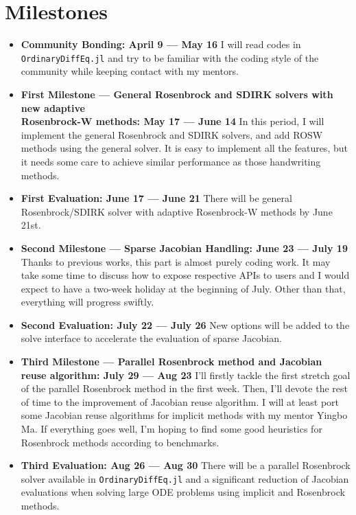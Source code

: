 \documentclass[a4paper]{article}
\begin{document}
\section{Milestones}
\label{sec:org8fb4a86}
\begin{itemize}
\item \textbf{Community Bonding: April 9 --- May 16}
I will read codes in \texttt{OrdinaryDiffEq.jl} and try to be familiar with the
coding style of the community while keeping contact with my mentors.
\item \textbf{First Milestone --- General Rosenbrock and SDIRK solvers with new adaptive\\
Rosenbrock-W methods: May 17 --- June 14}
In this period, I will implement the general Rosenbrock and SDIRK solvers,
and add ROSW methods using the general solver. It is easy to implement all
the features, but it needs some care to achieve similar performance as those
handwriting methods.
\item \textbf{First Evaluation: June 17 --- June 21}
There will be general Rosenbrock/SDIRK solver with adaptive Rosenbrock-W
methods by June 21st.
\item \textbf{Second Milestone --- Sparse Jacobian Handling: June 23 --- July 19}
Thanks to previous works, this part is almost purely coding work. It may
take some time to discuss how to expose respective APIs to users and I would
expect to have a two-week holiday at the beginning of July. Other than that,
everything will progress swiftly.
\item \textbf{Second Evaluation: July 22 --- July 26}
New options will be added to the solve interface to accelerate the
evaluation of sparse Jacobian.
\item \textbf{Third Milestone --- Parallel Rosenbrock method and Jacobian reuse algorithm: July 29 --- Aug 23}
I'll firstly tackle the first stretch goal of the parallel Rosenbrock method
in the first week. Then, I'll devote the rest of time to the improvement of
Jacobian reuse algorithm. I will at least port some Jacobian reuse
algorithms for implicit methods with my mentor Yingbo Ma. If everything goes
well, I'm hoping to find some good heuristics for Rosenbrock methods
according to benchmarks.
\item \textbf{Third Evaluation: Aug 26 --- Aug 30}
There will be a parallel Rosenbrock solver available in \texttt{OrdinaryDiffEq.jl}
and a significant reduction of Jacobian evaluations when solving large ODE
problems using implicit and Rosenbrock methods.
\end{itemize}
\end{document}

